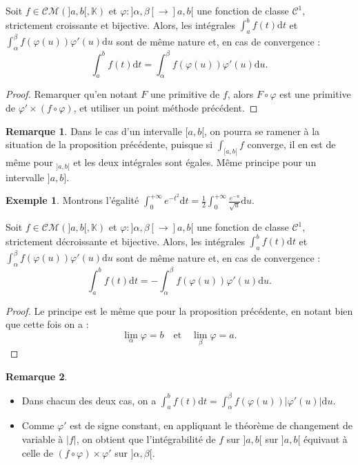 \documentclass[french]{article}
\newcommand{\K}{\mathbb{K}}
\renewcommand{\d}{\text{d}}
\theoremstyle{plain}
\theoremstyle{definition}
\newtheorem*{ex}{Exemple}
\newtheorem*{rmq}{Remarque}
\theoremstyle{remark}
\begin{document}
\begin{prop}%
	Soit $f\in\mathcal{CM}(]a,b[,\K)$ et $\varphi:]\alpha,\beta[\to]a,b[$ une fonction de classe $\mathcal{C}^1$, strictement croissante et bijective. Alors, les intégrales $\displaystyle\int_{a}^{b}f(t)\d t$ et $\displaystyle\int_{\alpha}^{\beta}f(\varphi(u))\varphi'(u)\d u$ sont de même nature et, en cas de convergence :
	$$\int_{a}^{b}f(t)\d t=\int_{\alpha}^{\beta}f(\varphi(u))\varphi'(u)\d u.$$
\end{prop}
\begin{proof}
	Remarquer qu'en notant $F$ une primitive de $f$, alors $F\circ\varphi$ est une primitive de $\varphi'\times(f\circ\varphi)$, et utiliser un point méthode précédent.
\end{proof}

\begin{rmq}
	Dans le cas d'un intervalle $[a,b[$, on pourra se ramener à la situation de la proposition précédente, puisque si $\displaystyle\int_{[a,b[}f$ converge, il en est de même pour $\displaystyle_{]a,b[}$ et les deux intégrales sont égales. Même principe pour un intervalle $]a,b]$.
\end{rmq}

\begin{ex}
	Montrons l'égalité $\displaystyle\int_{0}^{+\infty}e^{-t^2}\d t=\frac{1}{2}\int_{0}^{+\infty}\frac{e^{-u}}{\sqrt{u}}\d u$.
\end{ex}

\begin{prop}%
	Soit $f\in\mathcal{CM}(]a,b[,\K)$ et $\varphi:]\alpha,\beta[\to]a,b[$ une fonction de classe $\mathcal{C}^1$, strictement décroissante et bijective. Alors, les intégrales $\displaystyle\int_{a}^{b}f(t)\d t$ et $\displaystyle\int_{\alpha}^{\beta}f(\varphi(u))\varphi'(u)\d u$ sont de même nature et, en cas de convergence :
	$$\int_{a}^{b}f(t)\d t=-\int_{\alpha}^{\beta}f(\varphi(u))\varphi'(u)\d u.$$
\end{prop}
\begin{proof}
	Le principe est le même que pour la proposition précédente, en notant bien que cette fois on a : $$\underset{\alpha}{\lim}\varphi=b\quad\text{et}\quad\underset{\beta}{\lim}\varphi=a.$$
\end{proof}

\begin{rmq}
	\begin{itemize}
		\item Dans chacun des deux cas, on a 	$\displaystyle\int_{a}^{b}f(t)\d t=\int_{\alpha}^{\beta}f(\varphi(u))\lvert\varphi'(u)\rvert \d u.$
		\item Comme $\varphi'$ est de signe constant, en appliquant le théorème de changement de variable à $\lvert f\rvert$, on obtient que l'intégrabilité de $f$ sur $]a,b[$ sur $]a,b[$ équivaut à celle de $(f\circ\varphi)\times\varphi'$ sur $]\alpha,\beta[$.
	\end{itemize}
\end{rmq}
\end{document}
